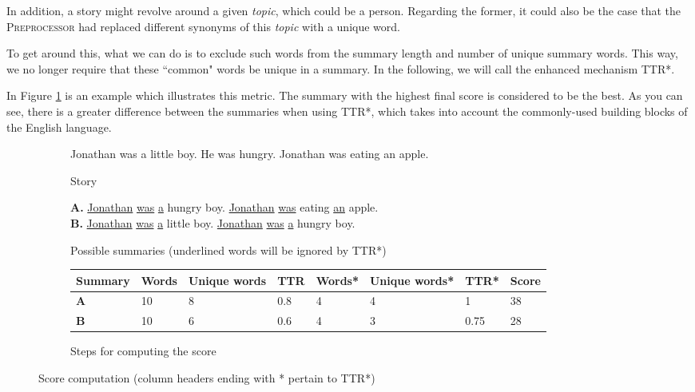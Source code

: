 In addition, a story might revolve around a given \textit{topic}, which could be a person. Regarding the former, it could also be the case that the \textsc{Preprocessor} had replaced different synonyms of this \textit{topic} with a unique word.

To get around this, what we can do is to exclude such words from the summary length and number of unique summary words. This way, we no longer require that these ``common" words be unique in a summary. In the following, we will call the enhanced mechanism \textsc{TTR*}.

In Figure \ref{fig:score_example} is an example which illustrates this metric. The summary with the highest final score is considered to be the best. As you can see, there is a greater difference between the summaries when using \textsc{TTR*}, which takes into account the commonly-used building blocks of the English language.

\begin{figure}[H]
\begin{subfigure}{\textwidth}
\begin{displayquote}
Jonathan was a little boy. He was hungry. Jonathan was eating an apple.
\end{displayquote}
\caption{Story}
\vspace{\baselineskip}
\end{subfigure}
\begin{subfigure}{\textwidth}
\begin{displayquote}
\textbf{A.} \underline{Jonathan} \underline{was} \underline{a} hungry boy. \underline{Jonathan} \underline{was} eating \underline{an} apple.\\
\textbf{B.} \underline{Jonathan} \underline{was} \underline{a} little boy. \underline{Jonathan} \underline{was} \underline{a} hungry boy.
\end{displayquote}
\caption{Possible summaries (underlined words will be ignored by \textsc{TTR*})}
\vspace{\baselineskip}
\end{subfigure}
\begin{subfigure}{\textwidth}
\centering
\begin{tabular}{@{}llllllll@{}}
\toprule
Summary & Words & Unique words & TTR & Words* & Unique words* & \textsc{TTR*} & Score \\ \midrule
\textbf{A} & 10    & 8            & 0.8 & 4      & 4             & 1    & 38    \\
\textbf{B} & 10    & 6            & 0.6 & 4      & 3             & 0.75 & 28    \\ \bottomrule
\end{tabular}
\caption{Steps for computing the score}
\end{subfigure}
\caption{Score computation (column headers ending with * pertain to \textsc{TTR*})}
\label{fig:score_example}
\end{figure}

